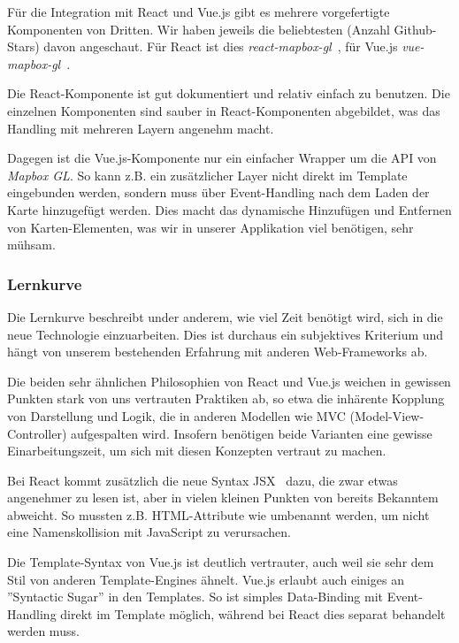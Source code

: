 Für die Integration mit React und Vue.js gibt es mehrere vorgefertigte Komponenten von Dritten.
Wir haben jeweils die beliebtesten (Anzahl Github-Stars) davon angeschaut.
Für React ist dies \emph{react-mapbox-gl}~\cite{react_mapbox_gl}, für Vue.js \emph{vue-mapbox-gl}~\cite{vue_mapbox_gl}.

Die React-Komponente ist gut dokumentiert und relativ einfach zu benutzen.
Die einzelnen Komponenten sind sauber in React-Komponenten abgebildet, was das Handling mit mehreren Layern angenehm macht.

Dagegen ist die Vue.js-Komponente nur ein einfacher Wrapper um die API von \emph{Mapbox GL}.
So kann z.B. ein zusätzlicher Layer nicht direkt im Template eingebunden werden, sondern muss über Event-Handling nach dem Laden der Karte hinzugefügt werden.
Dies macht das dynamische Hinzufügen und Entfernen von Karten-Elementen, was wir in unserer Applikation viel benötigen, sehr mühsam.

\subsubsection{Lernkurve}
\label{Analyse Framework:Lernkurve}

Die Lernkurve beschreibt under anderem, wie viel Zeit benötigt wird, sich in die neue Technologie einzuarbeiten.
Dies ist durchaus ein subjektives Kriterium und hängt von unserem bestehenden Erfahrung mit anderen Web-Frameworks ab.

Die beiden sehr ähnlichen Philosophien von React und Vue.js weichen in gewissen Punkten stark von uns vertrauten Praktiken ab, so etwa die inhärente Kopplung von Darstellung und Logik, die in anderen Modellen wie MVC (Model-View-Controller) aufgespalten wird.
Insofern benötigen beide Varianten eine gewisse Einarbeitungszeit, um sich mit diesen Konzepten vertraut zu machen.

Bei React kommt zusätzlich die neue Syntax JSX~\cite{jsx} dazu, die zwar etwas angenehmer zu lesen ist, aber in vielen kleinen Punkten von bereits Bekanntem abweicht.
So mussten z.B. HTML-Attribute wie  umbenannt werden, um nicht eine Namenskollision mit JavaScript zu verursachen.

Die Template-Syntax von Vue.js ist deutlich vertrauter, auch weil sie sehr dem Stil von anderen Template-Engines ähnelt.
Vue.js erlaubt auch einiges an ''Syntactic Sugar'' in den Templates.
So ist simples Data-Binding mit Event-Handling direkt im Template möglich, während bei React dies separat behandelt werden muss.

